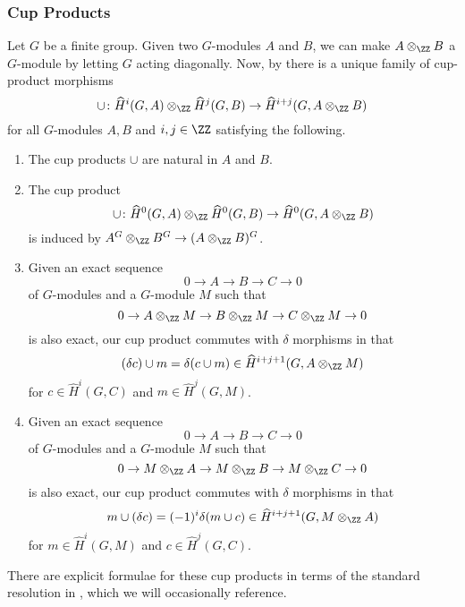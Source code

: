 \subsubsection{Cup Products}
Let $G$ be a finite group. Given two $G$-modules $A$ and $B$, we can make $A\otimes_\ZZ B$ a $G$-module by letting $G$ acting diagonally. Now, by \cite[Theorem~4]{atiyah-wall} there is a unique family of cup-product morphisms
\[\cup\colon\widehat H^i(G,A)\otimes_\ZZ\widehat H^j(G,B)\to\widehat H^{i+j}(G,A\otimes_\ZZ B)\]
for all $G$-modules $A,B$ and $i,j\in\ZZ$ satisfying the following.
\begin{enumerate}
	\item The cup products $\cup$ are natural in $A$ and $B$.
	\item The cup product
	\[\cup\colon\widehat H^0(G,A)\otimes_\ZZ\widehat H^0(G,B)\to\widehat H^0(G,A\otimes_\ZZ B)\]
	is induced by $A^G\otimes_\ZZ B^G\to(A\otimes_\ZZ B)^G$.
	\item Given an exact sequence
	\[0\to A\to B\to C\to 0\]
	of $G$-modules and a $G$-module $M$ such that
	\[0\to A\otimes_\ZZ M\to B\otimes_\ZZ M\to C\otimes_\ZZ M\to 0\]
	is also exact, our cup product commutes with $\delta$ morphisms in that
	\[(\delta c)\cup m=\delta(c\cup m)\in\widehat H^{i+j+1}(G,A\otimes_\ZZ M)\]
	for $c\in\widehat H^i(G,C)$ and $m\in\widehat H^j(G,M)$.
	\item Given an exact sequence
	\[0\to A\to B\to C\to 0\]
	of $G$-modules and a $G$-module $M$ such that
	\[0\to M\otimes_\ZZ A\to M\otimes_\ZZ B\to M\otimes_\ZZ C\to 0\]
	is also exact, our cup product commutes with $\delta$ morphisms in that
	\[m\cup(\delta c)=(-1)^i\delta(m\cup c)\in\widehat H^{i+j+1}(G,M\otimes_\ZZ A)\]
	for $m\in\widehat H^i(G,M)$ and $c\in\widehat H^j(G,C)$.
\end{enumerate}
There are explicit formulae for these cup products in terms of the standard resolution in \cite[p.~107]{atiyah-wall}, which we will occasionally reference.

